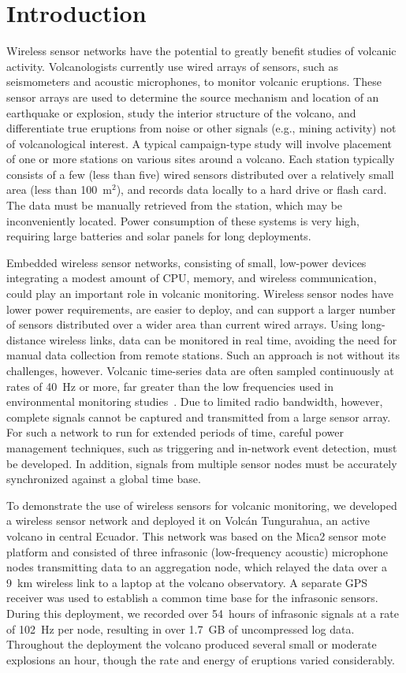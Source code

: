 \section{Introduction}

Wireless sensor networks have the potential to greatly benefit studies
of volcanic activity. Volcanologists currently use wired arrays of
sensors, such as seismometers and acoustic microphones, to monitor
volcanic eruptions. These sensor arrays are used to determine the source
mechanism and location of an earthquake or explosion, study the interior
structure of the volcano, and differentiate true eruptions from noise
or other signals (e.g., mining activity) not of volcanological
interest. A typical campaign-type study will involve placement of one or
more stations on various sites around a volcano.  Each station typically
consists of a few (less than five) wired sensors distributed over
a relatively small area (less than 100~m$^2$), and records data locally
to a hard drive or flash card.  The data must be manually retrieved
from the station, which may be inconveniently located. Power
consumption of these systems is very high, requiring large batteries
and solar panels for long deployments.

Embedded wireless sensor networks, consisting of small, low-power devices
integrating a modest amount of CPU, memory, and wireless communication,
could play an important role in volcanic monitoring.
Wireless sensor nodes have lower power requirements, are easier to 
deploy, and can support a larger number of sensors distributed over 
a wider area than current wired arrays. Using long-distance wireless
links, data can be monitored in real time, avoiding the need for
manual data collection from remote stations. Such an approach is not without
its challenges, however. Volcanic time-series data are often sampled
continuously at rates of 40~Hz or more, far greater than the 
low frequencies used in environmental monitoring
studies~\cite{gdi-ewsn04}. Due to limited radio bandwidth, however,
complete signals cannot be captured and transmitted from a large sensor
array. For such a network to run for extended periods of time, careful power
management techniques, such as triggering and in-network event detection, must be developed. 
In addition, signals from multiple sensor 
nodes must be accurately synchronized against a global time base.

To demonstrate the use of wireless sensors for volcanic monitoring,
we developed a wireless sensor network and deployed it on Volc\'{a}n
Tungurahua, an active volcano in central Ecuador. This network was 
based on the Mica2 sensor mote platform and consisted of three 
infrasonic (low-frequency acoustic) 
microphone nodes transmitting data to an aggregation
node, which relayed the data over a 9~km wireless link
to a laptop at the volcano observatory. A separate GPS
receiver was used to establish a common time base for the infrasonic
sensors. During this deployment, we recorded over 54~hours of
infrasonic signals at a rate of 102~Hz per node, resulting in
over 1.7~GB of uncompressed log data. Throughout the deployment the volcano
produced several small or moderate explosions an hour, though the rate and
energy of eruptions varied considerably.  

